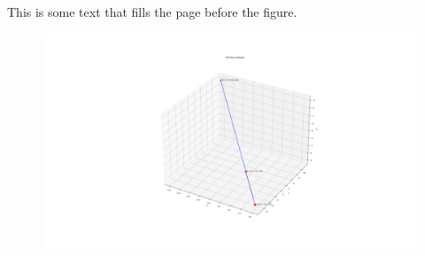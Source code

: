 \documentclass[journal,12pt,onecolumn]{IEEEtran}
\theoremstyle{remark}
\begin{document}
This is some text that fills the page before the figure.

\newpage %

\begin{figure}[h]
    \centering
    \includegraphics[width=\textwidth]{figure.png} 
    \label{fig:example_image}
\end{figure}
\end{document}
